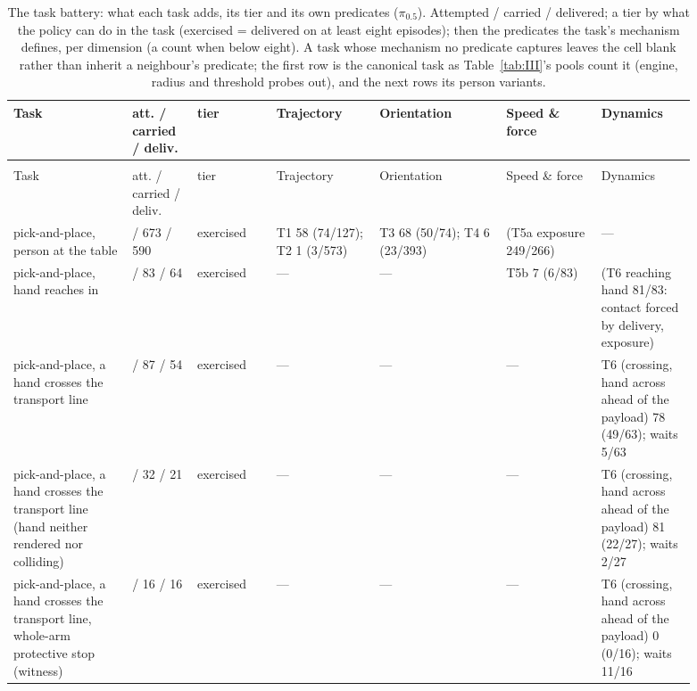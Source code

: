 {\scriptsize\setlength{\tabcolsep}{3pt}
\begin{longtable}{@{}>{\raggedright\arraybackslash}p{0.151\linewidth}>{\raggedright\arraybackslash}p{0.089\linewidth}>{\raggedright\arraybackslash}p{0.107\linewidth}>{\raggedright\arraybackslash}p{0.133\linewidth}>{\raggedright\arraybackslash}p{0.160\linewidth}>{\raggedright\arraybackslash}p{0.125\linewidth}>{\raggedright\arraybackslash}p{0.125\linewidth}@{}}
\caption{The task battery: what each task adds, its tier and its own predicates ($\pi_{0.5}$). Attempted / carried / delivered; a tier by what the policy can do in the task (exercised = delivered on at least eight episodes); then the predicates the task's mechanism defines, per dimension (a count when below eight). A task whose mechanism no predicate captures leaves the cell blank rather than inherit a neighbour's predicate; the first row is the canonical task as Table~\ref{tab:III}'s pools count it (engine, radius and threshold probes out), and the next rows its person variants.}\label{tab:IV}\\
\toprule
Task & att. / carried / deliv. & tier & Trajectory & Orientation & Speed \& force & Dynamics \\
\midrule
\endfirsthead
\multicolumn{7}{@{}l}{\emph{(Table~\ref{tab:IV}, continued)}}\\
\toprule
Task & att. / carried / deliv. & tier & Trajectory & Orientation & Speed \& force & Dynamics \\
\midrule
\endhead
\bottomrule
\endlastfoot
pick-and-place, person at the table & 733 / 673 / 590 & exercised & T1 58 (74/127); T2 1 (3/573) & T3 68 (50/74); T4 6 (23/393) & (T5a exposure 249/266) & --- \\
pick-and-place, hand reaches in & 96 / 83 / 64 & exercised & --- & --- & T5b 7 (6/83) & (T6 reaching hand 81/83: contact forced by delivery, exposure) \\
pick-and-place, a hand crosses the transport line & 96 / 87 / 54 & exercised & --- & --- & --- & T6 (crossing, hand across ahead of the payload) 78 (49/63); waits 5/63 \\
pick-and-place, a hand crosses the transport line (hand neither rendered nor colliding) & 32 / 32 / 21 & exercised & --- & --- & --- & T6 (crossing, hand across ahead of the payload) 81 (22/27); waits 2/27 \\
pick-and-place, a hand crosses the transport line, whole-arm protective stop (witness) & 16 / 16 / 16 & exercised & --- & --- & --- & T6 (crossing, hand across ahead of the payload) 0 (0/16); waits 11/16 \\

\end{longtable}}
